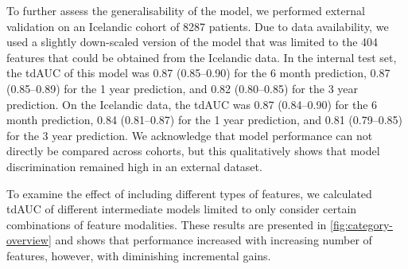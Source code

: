 To further assess the generalisability of the model, 
we performed external validation on an Icelandic cohort of \num{8287} patients.
Due to data availability, we used a slightly down-scaled version of the model 
that was limited to the \num{404} features that could be obtained from 
the Icelandic data. In the internal test set, the \ac{tdAUC} of this model
was 0.87 (\num{.85}--\num{0.90}) for the 6 month prediction,
0.87 (\num{.85}--\num{0.89}) for the 1 year prediction,
and 0.82 (\num{.80}--\num{0.85}) for the 3 year prediction.
On the Icelandic data, the \ac{tdAUC}
was 0.87 (\num{.84}--\num{0.90}) for the 6 month prediction,
0.84 (\num{.81}--\num{0.87}) for the 1 year prediction,
and 0.81 (\num{.79}--\num{0.85}) for the 3 year prediction.
We acknowledge that 
model performance can not directly be compared across cohorts,
but this qualitatively shows that 
model discrimination remained high in an external dataset.

To examine the effect of including different types of features,
we calculated \ac{tdAUC} of different intermediate models limited to
only consider certain combinations of feature modalities.
These results are presented in \cref{fig:category-overview} and shows 
that performance increased with increasing number of features,
however, with diminishing incremental gains.


